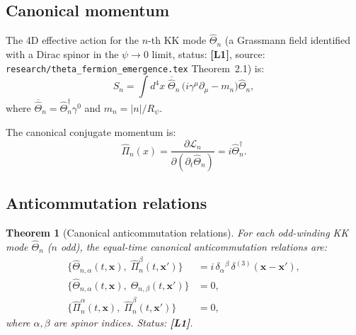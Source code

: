 \documentclass[11pt,a4paper]{article}
\newtheorem{theorem}{Theorem}
\newcommand{\Lone}{\textbf{[L1]}}
\begin{document}
\subsection{Canonical momentum}

The 4D effective action for the $n$-th KK mode $\hat\Theta_n$ (a Grassmann field
identified with a Dirac spinor in the $\psi\to 0$ limit, status: \Lone{},
source: \texttt{research/theta\_fermion\_emergence.tex} Theorem~2.1) is:
\begin{equation}
\label{eq:4d_action}
  S_n = \int d^4x\;
  \overline{\hat\Theta}_n\,
  \bigl(i\gamma^\mu\partial_\mu - m_n\bigr)\hat\Theta_n,
\end{equation}
where $\overline{\hat\Theta}_n = \hat\Theta_n^\dagger\gamma^0$ and
$m_n = |n|/R_\psi$.

The canonical conjugate momentum is:
\begin{equation}
  \hat\Pi_n(x) = \frac{\partial\mathcal{L}_n}{\partial(\partial_t\hat\Theta_n)}
  = i\hat\Theta_n^\dagger.
\end{equation}

\subsection{Anticommutation relations}

\begin{theorem}[Canonical anticommutation relations]\label{thm:car}
  For each odd-winding KK mode $\hat\Theta_n$ ($n$ odd), the equal-time
  canonical anticommutation relations are:
  \begin{align}
  \label{eq:car_main}
    \bigl\{\hat\Theta_{n,\alpha}(t,\mathbf{x}),\;
            \hat\Pi_n^\beta(t,\mathbf{x}')\bigr\}
    &= i\,\delta_\alpha{}^\beta\,\delta^{(3)}(\mathbf{x}-\mathbf{x}'), \\
  \label{eq:car_ff}
    \bigl\{\hat\Theta_{n,\alpha}(t,\mathbf{x}),\;
            \hat\Theta_{n,\beta}(t,\mathbf{x}')\bigr\}
    &= 0, \\
  \label{eq:car_pp}
    \bigl\{\hat\Pi_n^\alpha(t,\mathbf{x}),\;
            \hat\Pi_n^\beta(t,\mathbf{x}')\bigr\}
    &= 0,
  \end{align}
  where $\alpha,\beta$ are spinor indices.
  Status: \Lone{}.
\end{theorem}
\end{document}
